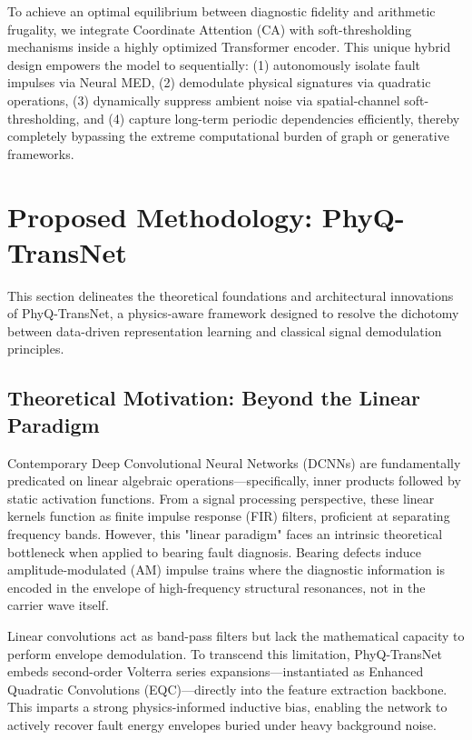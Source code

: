 \documentclass[5p,times,twocolumn]{elsarticle}
\begin{document}
To achieve an optimal equilibrium between diagnostic fidelity and arithmetic frugality, we integrate Coordinate Attention (CA) \cite{P12_Yang} with soft-thresholding mechanisms \cite{P20_Zhao} inside a highly optimized Transformer encoder. This unique hybrid design empowers the model to sequentially: (1) autonomously isolate fault impulses via Neural MED, (2) demodulate physical signatures via quadratic operations, (3) dynamically suppress ambient noise via spatial-channel soft-thresholding, and (4) capture long-term periodic dependencies efficiently, thereby completely bypassing the extreme computational burden of graph or generative frameworks.

\section{Proposed Methodology: PhyQ-TransNet}

This section delineates the theoretical foundations and architectural innovations of PhyQ-TransNet, a physics-aware framework designed to resolve the dichotomy between data-driven representation learning and classical signal demodulation principles.

\subsection{Theoretical Motivation: Beyond the Linear Paradigm}
Contemporary Deep Convolutional Neural Networks (DCNNs) are fundamentally predicated on linear algebraic operations—specifically, inner products followed by static activation functions. From a signal processing perspective, these linear kernels function as finite impulse response (FIR) filters, proficient at separating frequency bands. However, this "linear paradigm" faces an intrinsic theoretical bottleneck when applied to bearing fault diagnosis. Bearing defects induce amplitude-modulated (AM) impulse trains where the diagnostic information is encoded in the envelope of high-frequency structural resonances, not in the carrier wave itself.

Linear convolutions act as band-pass filters but lack the mathematical capacity to perform envelope demodulation. To transcend this limitation, PhyQ-TransNet embeds second-order Volterra series expansions—instantiated as Enhanced Quadratic Convolutions (EQC)—directly into the feature extraction backbone. This imparts a strong physics-informed inductive bias, enabling the network to actively recover fault energy envelopes buried under heavy background noise.
\end{document}
